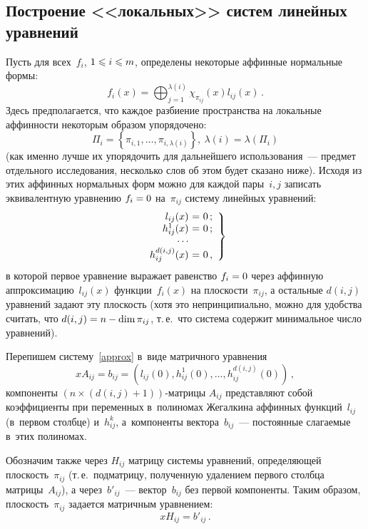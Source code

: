 \begin{multicols}{2}
\subsection{Построение <<локальных>> систем линейных уравнений}

Пусть для всех~$f_i$, $1\hm\leqslant i\hm\leqslant m$, определены некоторые аффинные нормальные 
формы:
\begin{equation*}
\label{AffNF_ij}
    f_i(x) = \bigoplus_{j=1}^{\lambda(i)} \chi_{\pi_{ij}}(x)l_{ij}(x)\,.
\end{equation*}
Здесь предполагается, что каждое разбиение пространства на локальные аффинности 
некоторым образом упорядочено: 
$$
\Pi_i=\left\{\pi_{i,1},\ldots,\pi_{i,\lambda(i)}\right\}, \
\lambda(i)=\lambda(\Pi_i)
$$ 
(как именно лучше их упорядочить для дальнейшего 
использования~--- предмет отдельного исследования, несколько слов об этом будет 
сказано ниже).
Исходя из этих аффинных нормальных форм можно для каждой пары~$i,j$ записать 
эквивалентную уравнению $f_i\hm=0$ на~$\pi_{ij}$ систему линейных уравнений:
\begin{equation}
\label{approx}
  \left.
    \begin{array}{r@{\ }c@{\ }l}
        l_{ij}(x)&=&0\,;\\
        h_{ij}^1(x)&=&0\,;\\
        \cdots\\
        h_{ij}^{d(i,j)}(x)&=&0\,,\\
    \end{array}
  \right\}
\end{equation}
в которой первое уравнение выражает равенство $f_i\hm=0$ через аффинную 
аппроксимацию~$l_{ij}(x)$ функции~$f_i(x)$ на плос\-кости~$\pi_{ij}$, а остальные 
$d(i,j)$ уравнений задают эту плоскость (хотя это непринципиально, можно для 
удобства считать, что $d(i,j)\hm=n\hm-\mathrm{dim}\, \pi_{ij}$, т.\,е.\ 
что система содержит  минимальное число уравнений).


Перепишем систему~\eqref{approx} в~виде матричного уравнения
$$
xA_{ij} = b_{ij} = \left(l_{ij}(0),h_{ij}^1(0),\ldots,h_{ij}^{d(i,j)}(0)\right)\,,
$$
компоненты $\left(n\times(d(i,j)+1)\right)$-мат\-ри\-цы $A_{ij}$ представляют собой 
коэффициенты при переменных в~полиномах Жегалкина аффинных функций~$l_{ij}$ 
(в~первом столбце) и~$h_{ij}^k$, а~компоненты вектора~$b_{ij}$~--- постоянные 
слагаемые в~этих полиномах.

Обозначим также через $H_{ij}$ матрицу системы уравнений, определяющей 
плоскость~$\pi_{ij}$ (т.\,е.\ подматрицу, полученную удалением первого столбца 
матрицы~$A_{ij}$), а через~$b'_{ij}$~--- вектор~$b_{ij}$ без первой компоненты. 
Таким образом, плоскость~$\pi_{ij}$ задается матричным уравнением:
\begin{equation}
\label{flat-matrix-eq}
    xH_{ij}=b'_{ij}\,.
\end{equation}



\end{multicols}
